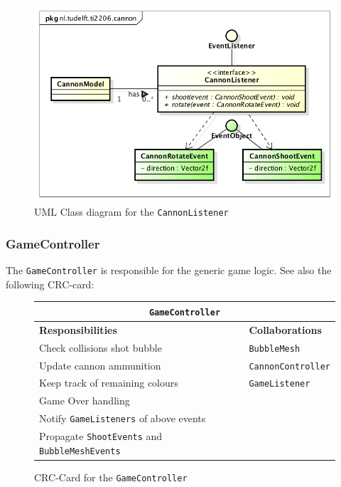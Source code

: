 \documentclass[a4paper]{article}
\begin{document}
\begin{figure}[H]
    \centering
    \includegraphics[scale=0.5]{CannonListener.png}
    \caption{UML Class diagram for the \texttt{CannonListener}}
\end{figure}

\subsubsection*{GameController}
The \texttt{GameController} is responsible for the generic game logic. See also the following CRC-card:

\begin{figure}[H]
    \begin{center}
    \begin{tabular}{ | p{8cm} | p{4cm} | }
      \multicolumn{2}{c}{\texttt{GameController}} \\ \hline
      \textbf{Responsibilities} & \textbf{Collaborations} \\ \hline
      Check collisions shot bubble & \texttt{BubbleMesh} \\
      Update cannon ammunition & \texttt{CannonController} \\
      Keep track of remaining colours & \texttt{GameListener} \\
      Game Over handling & \\
      Notify \texttt{GameListeners} of above events & \\
      Propagate \texttt{ShootEvents} and \texttt{BubbleMeshEvents} & \\
      \hline
    \end{tabular}
    \end{center}
    \caption{CRC-Card for the \texttt{GameController}}
\end{figure}
\end{document}
